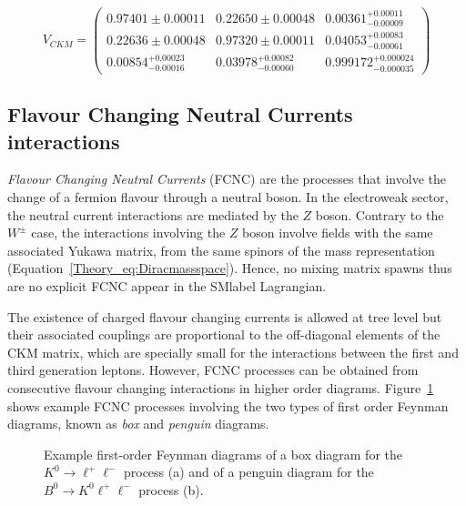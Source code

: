 \begin{equation}
        V_{CKM}= \begin{pmatrix} 0.97401 \pm 0.00011 & 0.22650 \pm 0.00048 & 0.00361^{+0.00011}_{-0.00009} \\ 0.22636 \pm 0.00048 & 0.97320 \pm 0.00011 & 0.04053^{+0.00083}_{-0.00061} \\ 0.00854^{+0.00023}_{-0.00016} & 0.03978^{+0.00082}_{-0.00060} & 0.999172^{+0.000024}_{-0.000035} \end{pmatrix}
\end{equation}

\subsection{Flavour Changing Neutral Currents interactions}
\label{Theory_SMsubsec:FCNC}
\textit{Flavour Changing Neutral Currents} (FCNC) are the processes that involve the change of a fermion flavour through a neutral boson. In the electroweak sector, the neutral current interactions are mediated by the $Z$ boson. Contrary to the $W^\pm$ case, the interactions involving the $Z$ boson involve fields with the same associated Yukawa matrix, from the same spinors of the mass representation (Equation~\ref{Theory_eq:Diracmassspace}). Hence, no mixing matrix spawns thus are no explicit FCNC appear in the \acrshort{SMlabel} Lagrangian.

The existence of charged flavour changing currents is allowed at tree level but their associated couplings are proportional to the off-diagonal elements of the CKM matrix, which are specially small for the interactions between the first and third generation leptons. However, FCNC processes can be obtained from consecutive flavour changing interactions in higher order diagrams. Figure~\ref{figSM:FCNCdiagrams} shows example FCNC processes involving the two types of first order Feynman diagrams, known as \textit{box} and \textit{penguin} diagrams.

\begin{figure}[htbp]
    \RawFloats
    \begin{center}
        \quad
        \caption{
            Example first-order Feynman diagrams of a box diagram for the $K^0\to\ell^+\ell^-$ process (a) and of a penguin diagram for the $B^0\to K^0\ell^+\ell^-$ process (b). 
    }
    \label{figSM:FCNCdiagrams}
    \end{center}
\end{figure}

